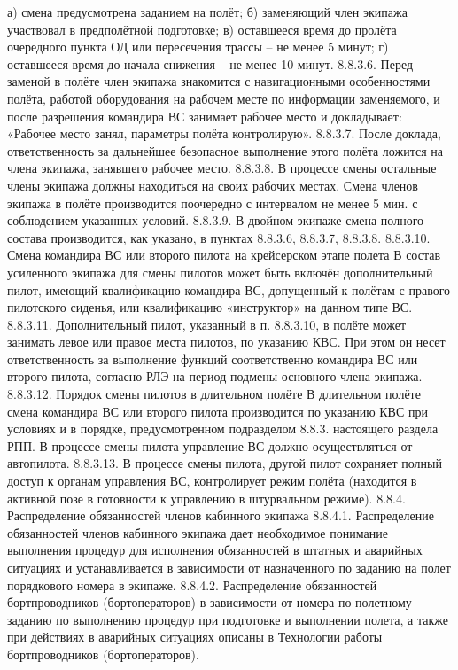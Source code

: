 а)	смена предусмотрена заданием на полёт;
б)	заменяющий член экипажа участвовал в предполётной подготовке;
в)	оставшееся время до пролёта очередного пункта ОД или пересечения трассы – не менее 5 минут;
г)	оставшееся время до начала снижения – не менее 10 минут.
8.8.3.6. Перед заменой в полёте член экипажа знакомится с навигационными особенностями полёта, работой оборудования на рабочем месте по информации заменяемого, и после разрешения командира ВС занимает рабочее место и докладывает: «Рабочее место занял, параметры полёта контролирую».
8.8.3.7. После доклада, ответственность за дальнейшее безопасное выполнение этого полёта ложится на члена экипажа, занявшего рабочее место.
8.8.3.8. В процессе смены остальные члены экипажа должны находиться на своих рабочих местах. Смена членов экипажа в полёте производится поочередно с интервалом не менее 5 мин. с соблюдением указанных условий.
8.8.3.9. В двойном экипаже смена полного состава производится, как указано, в пунктах 8.8.3.6, 8.8.3.7, 8.8.3.8.
           8.8.3.10. Смена командира ВС или второго пилота на крейсерском этапе полета
В состав усиленного экипажа для смены пилотов может быть включён дополнительный пилот, имеющий квалификацию командира ВС, допущенный к полётам с правого пилотского сиденья, или квалификацию «инструктор» на данном типе ВС.
8.8.3.11. Дополнительный пилот, указанный в п. 8.8.3.10, в полёте может занимать левое или правое места пилотов, по указанию КВС. При этом он несет ответственность за выполнение функций соответственно командира ВС или второго пилота, согласно РЛЭ на период подмены основного члена экипажа.
8.8.3.12. Порядок смены пилотов в длительном полёте
В длительном полёте смена командира ВС или второго пилота производится по указанию КВС при условиях и в порядке, предусмотренном подразделом 8.8.3. настоящего раздела РПП. В процессе смены пилота управление ВС должно осуществляться от автопилота.
8.8.3.13. В процессе смены пилота, другой пилот сохраняет полный доступ к органам управления ВС, контролирует режим полёта (находится в активной позе в готовности к управлению в штурвальном режиме).
8.8.4. Распределение обязанностей членов кабинного экипажа
8.8.4.1. Распределение обязанностей членов кабинного экипажа дает необходимое понимание выполнения процедур для исполнения обязанностей в штатных и аварийных ситуациях и устанавливается в зависимости от назначенного по заданию на полет порядкового номера в экипаже.
8.8.4.2. Распределение обязанностей бортпроводников (бортоператоров) в зависимости от номера по полетному заданию по выполнению процедур при подготовке и выполнении полета, а также при действиях в аварийных ситуациях описаны в Технологии работы бортпроводников (бортоператоров). 
